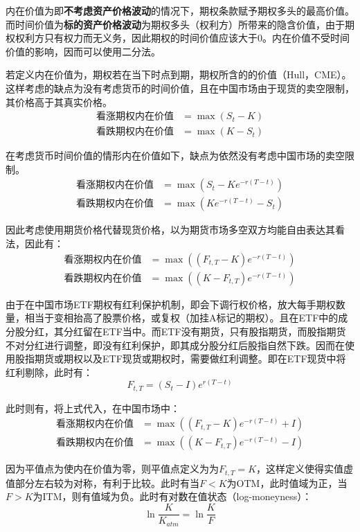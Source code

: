 \documentclass[11pt]{article}
\begin{document}
内在价值为即\textbf{不考虑资产价格波动}的情况下，期权条款赋予期权多头的最高价值。而时间价值为\textbf{标的资产价格波动}为期权多头（权利方）所带来的隐含价值，由于期权权利方只有权力而无义务，因此期权的时间价值应该大于0。内在价值不受时间价值的影响，因而可以使用二分法。


若定义内在价值为，期权若在当下时点到期，期权所含的的价值（Hull，CME）。这样考虑的缺点为没有考虑货币的时间价值，且在中国市场由于现货的卖空限制，其价格高于其真实价格。
\begin{align*}
    \text{看涨期权内在价值} & = \max(S_t-K) \\
    \text{看跌期权内在价值} & = \max(K-S_t)
\end{align*}

在考虑货币时间价值的情形内在价值如下，缺点为依然没有考虑中国市场的卖空限制。
\begin{align*}
    \text{看涨期权内在价值} & = \max(S_t-Ke^{-r(T-t)}) \\
    \text{看跌期权内在价值} & = \max(Ke^{-r(T-t)}-S_t)
\end{align*}

因此考虑使用期货价格代替现货价格，以为期货市场多空双方均能自由表达其看法，因此有：
\begin{align*}
    \text{看涨期权内在价值} & = \max((F_{t,T}-K)e^{-r(T-t)}) \\
    \text{看跌期权内在价值} & = \max((K-F_{t,T})e^{-r(T-t)})
\end{align*}

由于在中国市场ETF期权有红利保护机制，即会下调行权价格，放大每手期权数量，相当于变相抬高了股票价格，或复权（加挂A标记的期权）。且在ETF中的成分股分红，其分红留在ETF当中。而ETF没有期货，只有股指期货，而股指期货不对分红进行调整，即没有红利保护，即其成分股分红后股指自然下跌。因而在使用股指期货或期权以及ETF现货或期权时，需要做红利调整。即在ETF现货中将红利剔除，此时有：
\begin{equation*}
    F_{t,T} = (S_t-I)e^{r(T-t)}
\end{equation*}

此时则有，将上式代入，在中国市场中：
\begin{align*}
    \text{看涨期权内在价值} & = \max((F_{t,T}-K)e^{-r(T-t)}+I) \\
    \text{看跌期权内在价值} & = \max((K-F_{t,T})e^{-r(T-t)}-I)
\end{align*}

因为平值点为使内在价值为零，则平值点定义为为$F_{t,T}=K$，这样定义使得实值虚值部分左右较为对称，有利于比较。此时有当$F<K$为OTM，此时值域为正，当$F>K$为ITM，则有值域为负。此时有对数在值状态（log-moneyness）：
\begin{equation*}
    \ln{\frac{K}{K_{atm}}} = \ln{\frac{K}{F}}
\end{equation*}
\end{document}
